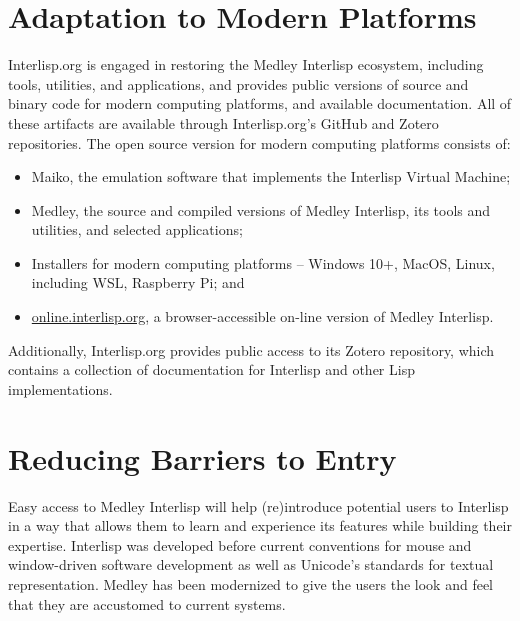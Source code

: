 \documentclass[sigconf]{acmart}
\begin{document}

\section{Adaptation to Modern Platforms}

Interlisp.org is engaged in restoring the Medley Interlisp ecosystem, including tools, utilities, and applications, and provides public versions of source and binary code for modern computing platforms, and available documentation. All of these artifacts are available through Interlisp.org's GitHub and Zotero repositories. The open source version for modern computing platforms consists of:

\begin{itemize}
  \item Maiko, the emulation software that implements the Interlisp Virtual Machine;

  \item Medley, the source and compiled versions of Medley Interlisp, its tools and utilities, and selected applications; 

  \item Installers for modern computing platforms – Windows 10+, MacOS, Linux, including WSL, Raspberry Pi; and

  \item \url{online.interlisp.org}, a browser-accessible on-line version of Medley Interlisp.
\end{itemize}

Additionally, Interlisp.org provides public access to its Zotero repository, which contains a collection of documentation for Interlisp and other Lisp implementations.

\section{Reducing Barriers to Entry}

Easy access to Medley Interlisp will help (re)introduce potential users to Interlisp in a way that allows them to learn and experience its features while building their expertise. Interlisp was developed before current conventions for mouse and window-driven software development as well as Unicode's standards for textual representation. Medley has been modernized to give the users the look and feel that they are accustomed to current systems.
\end{document}
